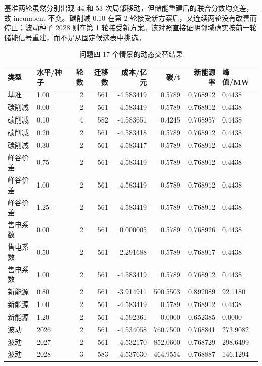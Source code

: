 基准两轮虽然分别出现 44 和 53 次局部移动，但储能重建后的联合分数均变差，故 incumbent 不变。碳削减 0.10 在第 2 轮接受新方案后，又连续两轮没有改善而停止；波动种子 2028 则在第 1 轮接受新方案。该对照直接证明邻域确实按前一轮储能信号重建，而不是从固定候选表中挑选。

\begin{table}[H]\centering\scriptsize
\caption{问题四 17 个情景的动态交替结果}\label{tab:q4scenarios}
\begin{tabular}{llrrrrrl}\toprule
类型 & 水平/种子 & 轮数 & 迁移数 & 成本/亿元 & 碳/t & 新能源率 & 峰值/MW\\\midrule
基准 & 1.00 & 2 & 561 & -4.583419 & 0.5789 & 0.768912 & 0.4438\\
碳削减 & 0.00 & 2 & 561 & -4.583419 & 0.5789 & 0.768912 & 0.4438\\
碳削减 & 0.10 & 4 & 582 & -4.583651 & 0.4245 & 0.768957 & 0.4438\\
碳削减 & 0.20 & 2 & 561 & -4.583418 & 0.5789 & 0.768912 & 0.4438\\
碳削减 & 0.30 & 2 & 561 & -4.583417 & 0.5789 & 0.768912 & 0.4438\\
峰谷价差 & 0.75 & 2 & 561 & -4.583419 & 0.5789 & 0.768912 & 0.4438\\
峰谷价差 & 1.00 & 2 & 561 & -4.583419 & 0.5789 & 0.768912 & 0.4438\\
峰谷价差 & 1.25 & 2 & 561 & -4.583419 & 0.5789 & 0.768912 & 0.4438\\
售电系数 & 0.00 & 2 & 561 & 0.000005 & 0.5789 & 0.768926 & 0.4438\\
售电系数 & 0.50 & 2 & 561 & -2.291688 & 0.5789 & 0.768917 & 0.4438\\
售电系数 & 1.00 & 2 & 561 & -4.583419 & 0.5789 & 0.768912 & 0.4438\\
新能源 & 0.80 & 2 & 561 & -3.914911 & 500.5503 & 0.892089 & 92.1180\\
新能源 & 1.00 & 2 & 561 & -4.583419 & 0.5789 & 0.768912 & 0.4438\\
新能源 & 1.20 & 2 & 561 & -4.592361 & 0.0000 & 0.652385 & 0.0000\\
波动 & 2026 & 2 & 561 & -4.534058 & 760.7500 & 0.768841 & 273.9082\\
波动 & 2027 & 2 & 561 & -4.532170 & 852.0600 & 0.768729 & 298.6499\\
波动 & 2028 & 3 & 583 & -4.537630 & 464.9554 & 0.768887 & 146.1294\\\bottomrule
\end{tabular}
\end{table}

